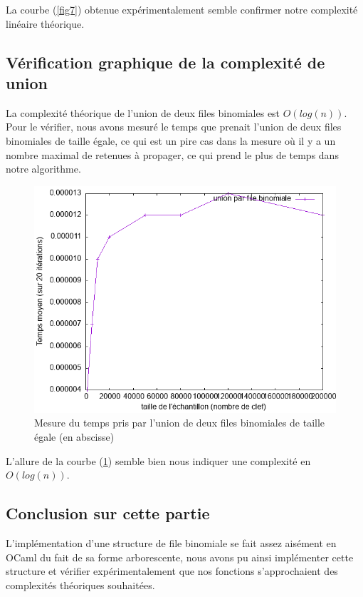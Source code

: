 \documentclass[12pt,a4paper]{article}
\begin{document}
La courbe (\ref{fig7}) obtenue expérimentalement semble confirmer notre complexité linéaire théorique.

\subsection{Vérification graphique de la complexité de union}

La complexité théorique de l'union de deux files binomiales est $O(log (n))$. Pour le vérifier, nous avons mesuré le temps que prenait l'union de deux files binomiales de taille égale, ce qui est un pire cas dans la mesure où il y a un nombre maximal de retenues à propager, ce qui prend le plus de temps dans notre algorithme.

\begin{figure}[hbtp]
\centering
\includegraphics[scale=0.4]{../Images/svg courbes pour rapport/cplxt_union_file.png}
\caption{Mesure du temps pris par l'union de deux files binomiales de taille égale (en abscisse)}
\label{fig8}
\end{figure}


L'allure de la courbe (\ref{fig8}) semble bien nous indiquer une complexité en $O(log (n))$.


\subsection{Conclusion sur cette partie}

L'implémentation d'une structure de file binomiale se fait assez aisément en OCaml du fait de sa forme arborescente, nous avons pu ainsi implémenter cette structure et vérifier expérimentalement que nos fonctions s'approchaient des complexités théoriques souhaitées.
\end{document}
